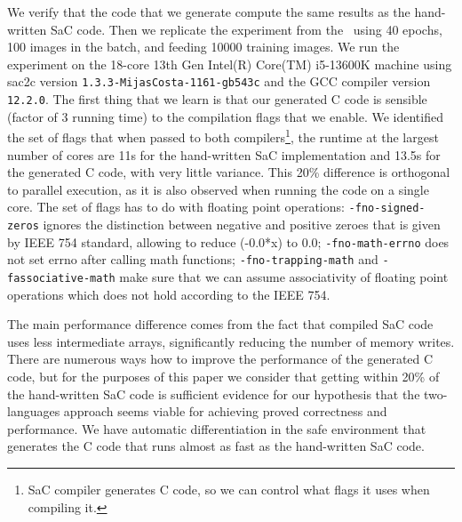 We verify that the code that we generate compute the same results
as the hand-written SaC code.  Then we replicate the experiment from
the~\cite{cnn-array} using 40 epochs, 100 images in the batch, and
feeding 10000 training images.  We run the experiment on the 18-core
13th Gen Intel(R) Core(TM) i5-13600K machine using sac2c version
\texttt{1.3.3-MijasCosta-1161-gb543c} and the GCC compiler
version \texttt{12.2.0}.  The first thing that we learn is that
our generated C code is sensible (factor of 3 running time)
to the compilation flags that we enable.  We identified the set
of flags that when passed to both compilers\footnote{SaC compiler
generates C code, so we can control what flags it uses when
compiling it.}, the runtime at the
largest number of cores are 11s for the hand-written SaC implementation 
and 13.5s for the generated C code, with
very little variance.  This 20\% difference is orthogonal
to parallel execution, as it is also observed when running
the code on a single core.  The set of flags has to do with
floating point operations: \texttt{-fno-signed-zeros} ignores
the distinction between negative and positive zeroes that is given
by IEEE 754 standard, allowing to reduce (-0.0*x) to 0.0;
\texttt{-fno-math-errno} does not set errno after calling math functions;
\texttt{-fno-trapping-math} and \texttt{-fassociative-math} make
sure that we can assume associativity of floating point operations
which does not hold according to the IEEE 754.

The main performance difference comes from the fact that
compiled SaC code uses less intermediate arrays, significantly reducing the number
of memory writes.  There are numerous ways how to improve the performance
of the generated C code, but for the purposes of this paper we consider that getting within
20\% of the hand-written SaC code is sufficient evidence for our hypothesis
that the two-languages approach seems viable for achieving proved
correctness and performance.
We have automatic differentiation in the safe environment
that generates the C code that runs almost as fast as the hand-written
SaC code.


















